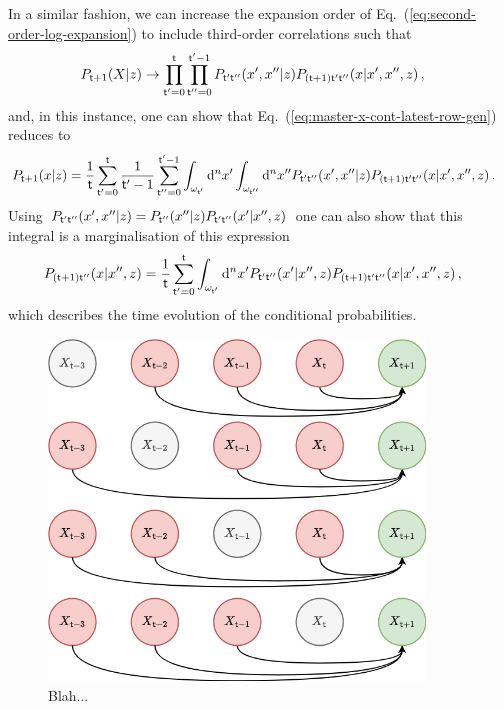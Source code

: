 In a similar fashion, we can increase the expansion order of Eq.~(\ref{eq:second-order-log-expansion}) to include third-order correlations such that 
\begin{align}
P_{{\sf t}+1}(X\vert z) &\rightarrow \prod_{{\sf t}'=0}^{{\sf t}}\prod_{{\sf t}''=0}^{{\sf t}'-1} P_{{\sf t}'{\sf t}''}(x',x''\vert z)P_{({\sf t}+1){\sf t}'{\sf t}''}(x\vert x',x'',z) \,,
\end{align}
and, in this instance, one can show that Eq.~(\ref{eq:master-x-cont-latest-row-gen}) reduces to
\begin{align}
P_{{\sf t}+1}(x\vert z) &= \frac{1}{{\sf t}}\sum_{{\sf t}'=0}^{{\sf t}}\frac{1}{{\sf t}'-1}\sum_{{\sf t}''=0}^{{\sf t}'-1}\int_{\omega_{{\sf t}'}}{\rm d}^nx'\int_{\omega_{{\sf t}''}}{\rm d}^nx'' P_{{\sf t}'{\sf t}''}(x',x''\vert z)P_{({\sf t}+1){\sf t}'{\sf t}''}(x\vert x',x'',z) \label{eq:third-order-correl} \,.
\end{align}
Using $P_{{\sf t}'{\sf t}''}(x',x''\vert z) = P_{{\sf t}''}(x''\vert z) P_{{\sf t}'{\sf t}''}(x'\vert x'', z)$ one can also show that this integral is a marginalisation of this expression
\begin{align}
P_{({\sf t}+1){\sf t}''}(x\vert x'', z) &= \frac{1}{{\sf t}}\sum_{{\sf t}'=0}^{{\sf t}}\int_{\omega_{{\sf t}'}}{\rm d}^nx'P_{{\sf t}'{\sf t}''}(x'\vert x'',z)P_{({\sf t}+1){\sf t}'{\sf t}''}(x\vert x',x'',z) \,,
\end{align}
which describes the time evolution of the conditional probabilities.

\begin{figure}[h]
\centering
\includegraphics[width=10cm]{images/chapter-2-third-temporal-correlation.drawio.png}
\caption{Blah...}
\label{fig:third-temporal-correlation}
\end{figure} 

